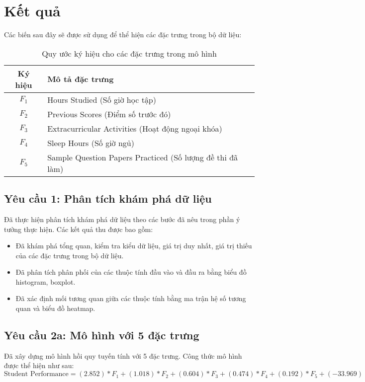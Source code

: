 \section{Kết quả}
Các biến sau đây sẽ được sử dụng để thể hiện các đặc trưng trong bộ dữ liệu:
\begin{table}[H]
	\centering
	\begin{tabular}{|c|l|}
		\hline
		\textbf{Ký hiệu} & \textbf{Mô tả đặc trưng}                                  \\
		\hline
		$F_1$            & Hours Studied (Số giờ học tập)                            \\
		$F_2$            & Previous Scores (Điểm số trước đó)                        \\
		$F_3$            & Extracurricular Activities (Hoạt động ngoại khóa)         \\
		$F_4$            & Sleep Hours (Số giờ ngủ)                                  \\
		$F_5$            & Sample Question Papers Practiced (Số lượng đề thi đã làm) \\
		\hline
	\end{tabular}
	\caption{Quy ước ký hiệu cho các đặc trưng trong mô hình}
\end{table}
\subsection{Yêu cầu 1: Phân tích khám phá dữ liệu}
Đã thực hiện phân tích khám phá dữ liệu theo các bước đã nêu trong phần ý tưởng thực hiện. Các kết quả thu được bao gồm:
\begin{itemize}
	\item Đã khám phá tổng quan, kiểm tra kiểu dữ liệu, giá trị duy nhất, giá trị thiếu của các đặc trưng trong bộ dữ liệu.
	\item Đã phân tích phân phối của các thuộc tính đầu vào và đầu ra bằng biểu đồ histogram, boxplot.
	\item Đã xác định mối tương quan giữa các thuộc tính bằng ma trận hệ số tương quan và biểu đồ heatmap.
\end{itemize}

\subsection{Yêu cầu 2a: Mô hình với 5 đặc trưng}
Đã xây dựng mô hình hồi quy tuyến tính với 5 đặc trưng. Công thức mô hình được thể hiện như sau:
$$\text{Student Performance} = (2.852)*F_1 + (1.018)*F_2 + (0.604)*F_3 + (0.474)*F_4 + (0.192)*F_5 + (-33.969)$$

